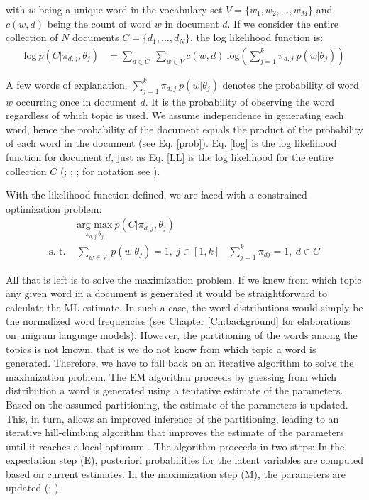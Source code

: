 \documentclass[11pt,a4paper,english,oneside]{book}
\numberwithin{equation}{chapter}
\begin{document}
\noindent with $w$ being a unique word in the vocabulary set $V = \{w_1, w_2, ..., w_M\}$ and $c(w,d)$ being the count of word $w$ in document $d$. If we consider the entire collection of $N$ documents $C=\{d_1,...,d_N\}$, the log likelihood function is:
\begin{align}
\label{LL} \text{log} \ p(C|\pi_{d,j},\theta_j) &= \underset{d \in C}{\sum} \ \underset{w \in V}\sum c(w,d) \ \text{log} \left( \sum_{j=1}^{k}\pi_{d,j} \ p(w|\theta_j) \right)
\end{align}


A few words of explanation. $\sum_{j=1}^{k}\pi_{d,j} \ p(w|\theta_j)$ denotes the probability of word $w$ occurring once in document $d$. It is the probability of observing the word regardless of which topic is used. We assume independence in generating each word, hence the probability of the document equals the product of the probability of each word in the document (see Eq. \ref{prob}). Eq. \ref{log} is the log likelihood function for document $d$, just as Eq. \ref{LL} is the log likelihood for the entire collection $C$ (\citealp{Hofmann.1999}; \citeyear{Hofmann.2001}; \citealp{Steyvers(2007)}; for notation see \citealp[~p. 340--377]{Zhai.2016}).

With the likelihood function defined, we are faced with a constrained optimization problem:
\begin{align}\label{argmax}
 & \underset{\pi_{d,j} \ \theta_j}{\text{arg max}} \ p(C|\pi_{d,j},\theta_j) &\\
\label{constraints} \text{s. t. } & \underset{w \in V}{\sum} \ p(w | \theta_j) = 1, \  j \in [1,k] &  \sum_{j=1}^{k} \pi_{dj} = 1, \ d \in C
\end{align}

All that is left is to solve the maximization problem. If we knew from which topic any given word in a document is generated it would be straightforward to calculate the ML estimate. In such a case, the word distributions would simply be the normalized word frequencies (see Chapter \ref{Ch:background} for elaborations on unigram language models). However, the partitioning of the words among the topics is not known, that is we do not know from which topic a word is generated. Therefore, we have to fall back on an iterative algorithm to solve the maximization problem. The EM algorithm proceeds by guessing from which distribution a word is generated using a tentative estimate of the parameters. Based on the assumed partitioning, the estimate of the parameters is updated. This, in turn, allows an improved inference of the partitioning, leading to an iterative hill-climbing algorithm that improves the estimate of the parameters until it reaches a local optimum \cite[p. 360]{Zhai.2016}. The algorithm proceeds in two steps: In the expectation step (E), posteriori probabilities for the latent variables are computed based on current estimates. In the maximization step (M), the parameters are updated (\citealp[p. 290]{Hofmann.1999}; \citeyear[pp. 181--182]{Hofmann.1999}). 
\end{document}
